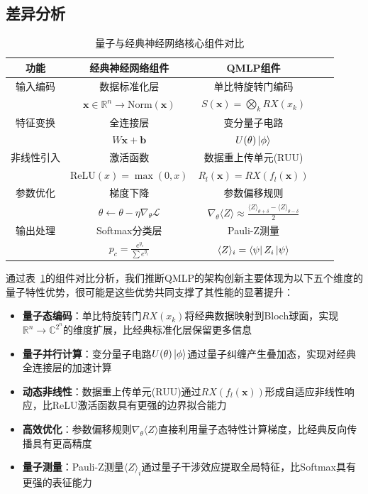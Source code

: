 \documentclass[10pt,a4paper,twoside]{article}
\numberwithin{figure}{section}%
\numberwithin{table}{section}%
\begin{document}
\subsection{差异分析}
\begin{table}[H]
    \centering
    \caption{量子与经典神经网络核心组件对比}
    \label{tab:quantum_classical}
    \begin{tabular}{ccccc}
        \toprule
        \textbf{功能} & \textbf{经典神经网络组件} & \textbf{QMLP组件} \\
        \midrule
        输入编码 & 数据标准化层 & 单比特旋转门编码 \\
        & $\mathbf{x} \in \mathbb{R}^n \to \text{Norm}(\mathbf{x})$ & $S(\mathbf{x}) = \bigotimes_k RX(x_k)$ \\
        \midrule
        特征变换 & 全连接层 & 变分量子电路 \\
        & $W\mathbf{x} + \mathbf{b}$ & $U(\theta)\ket{\phi}$ \\
        \midrule
        非线性引入 & 激活函数 & 数据重上传单元(RUU) \\
        & $\text{ReLU}(x)=\max(0,x)$ & $R_l(\mathbf{x}) = RX(f_l(\mathbf{x}))$ \\
        \midrule
        参数优化 & 梯度下降 & 参数偏移规则 \\
        & $\theta \leftarrow \theta - \eta \nabla_\theta \mathcal{L}$ & $\nabla_\theta \langle Z\rangle \approx \frac{\langle Z\rangle_{\theta+\delta} - \langle Z\rangle_{\theta-\delta}}{2}$ \\
        \midrule
        输出处理 & Softmax分类层 & Pauli-Z测量 \\
        & $p_c = \frac{e^{y_c}}{\sum e^{y_i}}$ & $\langle Z\rangle_i = \bra{\psi}Z_i\ket{\psi}$ \\
        \bottomrule
    \end{tabular}
\end{table}

通过表~\ref{tab:quantum_classical}的组件对比分析，我们推断QMLP的架构创新主要体现为以下五个维度的量子特性优势，很可能是这些优势共同支撑了其性能的显著提升：

\begin{itemize}
    \item \textbf{量子态编码}：单比特旋转门$RX(x_k)$将经典数据映射到Bloch球面，实现$\mathbb{R}^n \to \mathbb{C}^{2^n}$的维度扩展，比经典标准化层保留更多信息
    
    \item \textbf{量子并行计算}：变分量子电路$U(\theta)\ket{\phi}$通过量子纠缠产生叠加态，实现对经典全连接层的加速计算
    
    \item \textbf{动态非线性}：数据重上传单元(RUU)通过$RX(f_l(\mathbf{x}))$形成自适应非线性响应，比ReLU激活函数具有更强的边界拟合能力
    
    \item \textbf{高效优化}：参数偏移规则$\nabla_\theta \langle Z\rangle$直接利用量子态特性计算梯度，比经典反向传播具有更高精度
    
    \item \textbf{量子测量}：Pauli-Z测量$\langle Z\rangle_i$通过量子干涉效应提取全局特征，比Softmax具有更强的表征能力
\end{itemize}
\end{document}
